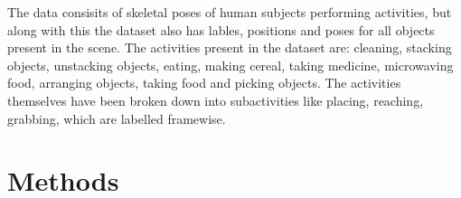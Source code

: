 \documentclass{article} %
\begin{document}
The data consisits of skeletal poses of human subjects performing activities, but along with this the dataset also has lables, positions and poses for all objects present in the scene. The activities present in the dataset are: cleaning, stacking objects, unstacking objects, eating, making cereal, taking medicine, microwaving food, arranging objects, taking food and picking objects. The activities themselves have been broken down into subactivities like placing, reaching, grabbing, which are labelled framewise.  

\section{Methods}




\end{document}
